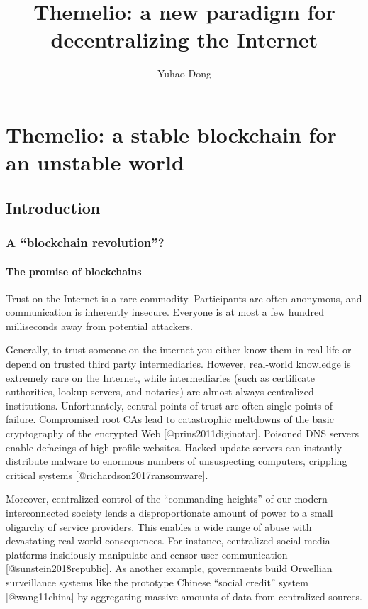 \documentclass[]{article}
\title{Themelio: a new paradigm for decentralizing the Internet}
\author{Yuhao Dong}
\date{}
\let\oldparagraph\paragraph
\renewcommand{\paragraph}[1]{\oldparagraph{#1}\mbox{}}
\begin{document}
\maketitle

\hypertarget{themelio-a-stable-blockchain-for-an-unstable-world}{%
\section{Themelio: a stable blockchain for an unstable
world}\label{themelio-a-stable-blockchain-for-an-unstable-world}}

\hypertarget{introduction}{%
\subsection{Introduction}\label{introduction}}

\hypertarget{a-blockchain-revolution}{%
\subsubsection{A ``blockchain
revolution''?}\label{a-blockchain-revolution}}

\hypertarget{the-promise-of-blockchains}{%
\paragraph{The promise of
blockchains}\label{the-promise-of-blockchains}}

Trust on the Internet is a rare commodity. Participants are often
anonymous, and communication is inherently insecure. Everyone is at most
a few hundred milliseconds away from potential attackers.

Generally, to trust someone on the internet you either know them in real
life or depend on trusted third party intermediaries. However,
real-world knowledge is extremely rare on the Internet, while
intermediaries (such as certificate authorities, lookup servers, and
notaries) are almost always centralized institutions. Unfortunately,
central points of trust are often single points of failure. Compromised
root CAs lead to catastrophic meltdowns of the basic cryptography of the
encrypted Web {[}@prins2011diginotar{]}. Poisoned DNS servers enable
defacings of high-profile websites. Hacked update servers can instantly
distribute malware to enormous numbers of unsuspecting computers,
crippling critical systems {[}@richardson2017ransomware{]}.

Moreover, centralized control of the ``commanding heights'' of our
modern interconnected society lends a disproportionate amount of power
to a small oligarchy of service providers. This enables a wide range of
abuse with devastating real-world consequences. For instance,
centralized social media platforms insidiously manipulate and censor
user communication {[}@sunstein2018republic{]}. As another example,
governments build Orwellian surveillance systems like the prototype
Chinese ``social credit'' system {[}@wang11china{]} by aggregating
massive amounts of data from centralized sources.
\end{document}
